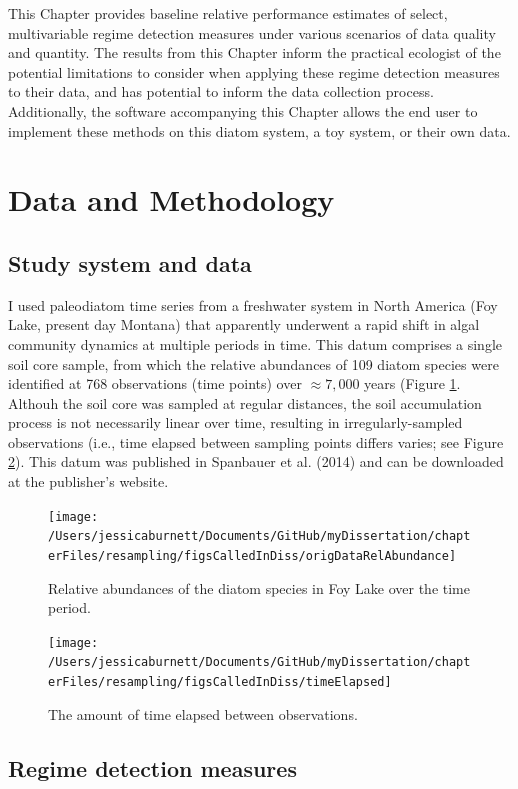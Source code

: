 \documentclass[12pt,twoside,openany]{reedthesis}
\begin{document}
This Chapter provides baseline relative performance estimates of select, multivariable regime detection measures under various scenarios of data quality and quantity. The results from this Chapter inform the practical ecologist of the potential limitations to consider when applying these regime detection measures to their data, and has potential to inform the data collection process. Additionally, the software accompanying this Chapter allows the end user to implement these methods on this diatom system, a toy system, or their own data.

\hypertarget{data-and-methodology}{%
\section{Data and Methodology}\label{data-and-methodology}}

\hypertarget{study-system-and-data}{%
\subsection{Study system and data}\label{study-system-and-data}}

I used paleodiatom time series from a freshwater system in North America (Foy Lake, present day Montana) that apparently underwent a rapid shift in algal community dynamics at multiple periods in time. This datum comprises a single soil core sample, from which the relative abundances of 109 diatom species were identified at 768 observations (time points) over \(\approx7,000\) years (Figure \ref{fig:origDat}. Althouh the soil core was sampled at regular distances, the soil accumulation process is not necessarily linear over time, resulting in irregularly-sampled observations (i.e., time elapsed between sampling points differs varies; see Figure \ref{fig:timeElapsed}). This datum was published in Spanbauer et al. (2014) and can be downloaded at the publisher's website.
\begin{figure}

{\centering \texttt{[image: /Users/jessicaburnett/Documents/GitHub/myDissertation/chapterFiles/resampling/figsCalledInDiss/origDataRelAbundance]} 

}

\caption{Relative abundances of the diatom species in Foy Lake over the time period.}\label{fig:origDat}
\end{figure}
\begin{figure}

{\centering \texttt{[image: /Users/jessicaburnett/Documents/GitHub/myDissertation/chapterFiles/resampling/figsCalledInDiss/timeElapsed]} 

}

\caption{The amount of time elapsed between observations.}\label{fig:timeElapsed}
\end{figure}
\hypertarget{regime-detection-measures}{%
\subsection{Regime detection measures}\label{regime-detection-measures}}
\end{document}
